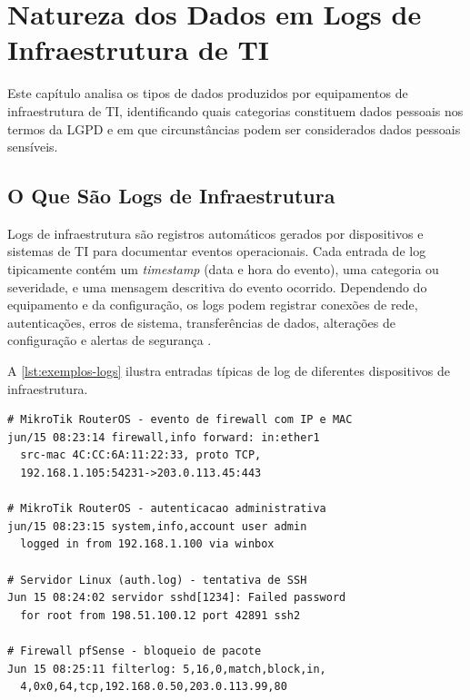 
\chapter{Natureza dos Dados em Logs de Infraestrutura de TI}
\label{cap:natureza}

Este capítulo analisa os tipos de dados produzidos por equipamentos de infraestrutura de TI, identificando quais categorias constituem dados pessoais nos termos da LGPD e em que circunstâncias podem ser considerados dados pessoais sensíveis.

\section{O Que São Logs de Infraestrutura}
\label{sec:o-que-sao-logs}

Logs de infraestrutura são registros automáticos gerados por dispositivos e sistemas de TI para documentar eventos operacionais. Cada entrada de log tipicamente contém um \textit{timestamp} (data e hora do evento), uma categoria ou severidade, e uma mensagem descritiva do evento ocorrido. Dependendo do equipamento e da configuração, os logs podem registrar conexões de rede, autenticações, erros de sistema, transferências de dados, alterações de configuração e alertas de segurança \cite{kent2006guide}.

A \autoref{lst:exemplos-logs} ilustra entradas típicas de log de diferentes dispositivos de infraestrutura.

\begin{lstlisting}[language={}, caption={Exemplos de entradas de log de dispositivos de infraestrutura de TI}, label={lst:exemplos-logs}]
# MikroTik RouterOS - evento de firewall com IP e MAC
jun/15 08:23:14 firewall,info forward: in:ether1
  src-mac 4C:CC:6A:11:22:33, proto TCP,
  192.168.1.105:54231->203.0.113.45:443

# MikroTik RouterOS - autenticacao administrativa
jun/15 08:23:15 system,info,account user admin
  logged in from 192.168.1.100 via winbox

# Servidor Linux (auth.log) - tentativa de SSH
Jun 15 08:24:02 servidor sshd[1234]: Failed password
  for root from 198.51.100.12 port 42891 ssh2

# Firewall pfSense - bloqueio de pacote
Jun 15 08:25:11 filterlog: 5,16,0,match,block,in,
  4,0x0,64,tcp,192.168.0.50,203.0.113.99,80
\end{lstlisting}


